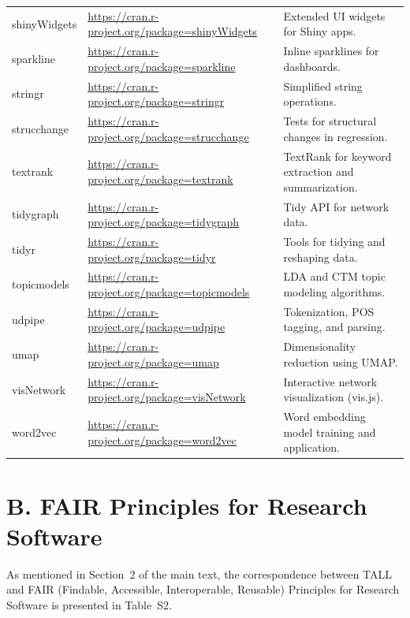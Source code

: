 \documentclass[8pt,a4paper]{article}
\begin{document}
\begin{longtable}{p{3cm} p{5.5cm} p{7.5cm}}
\textsf{shinyWidgets} & \url{https://cran.r-project.org/package=shinyWidgets} & Extended UI widgets for Shiny apps. \\
\textsf{sparkline} & \url{https://cran.r-project.org/package=sparkline} & Inline sparklines for dashboards. \\
\textsf{stringr} & \url{https://cran.r-project.org/package=stringr} & Simplified string operations. \\
\textsf{strucchange} & \url{https://cran.r-project.org/package=strucchange} & Tests for structural changes in regression. \\
\textsf{textrank} & \url{https://cran.r-project.org/package=textrank} & TextRank for keyword extraction and summarization. \\
\textsf{tidygraph} & \url{https://cran.r-project.org/package=tidygraph} & Tidy API for network data. \\
\textsf{tidyr} & \url{https://cran.r-project.org/package=tidyr} & Tools for tidying and reshaping data. \\
\textsf{topicmodels} & \url{https://cran.r-project.org/package=topicmodels} & LDA and CTM topic modeling algorithms. \\
\textsf{udpipe} & \url{https://cran.r-project.org/package=udpipe} & Tokenization, POS tagging, and parsing. \\
\textsf{umap} & \url{https://cran.r-project.org/package=umap} & Dimensionality reduction using UMAP. \\
\textsf{visNetwork} & \url{https://cran.r-project.org/package=visNetwork} & Interactive network visualization (vis.js). \\
\textsf{word2vec} & \url{https://cran.r-project.org/package=word2vec} & Word embedding model training and application. \\
\end{longtable}

\section*{B. \quad FAIR Principles for Research Software}
As mentioned in Section~2 of the main text, the correspondence between TALL and FAIR (Findable, Accessible, Interoperable, Reusable) Principles for Research Software \cite{wil16} is presented in Table~S2.
\end{document}
